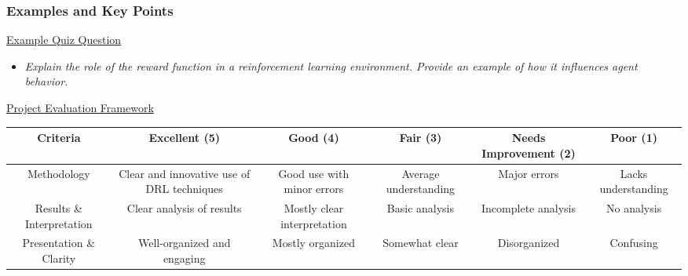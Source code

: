 \documentclass[aspectratio=169]{beamer}
\begin{document}
\begin{frame}[fragile]
  \frametitle{Examples and Key Points}

  \underline{Example Quiz Question}
  
  \begin{itemize}
    \item \textit{Explain the role of the reward function in a reinforcement learning environment. Provide an example of how it influences agent behavior.}
  \end{itemize}
  
  \underline{Project Evaluation Framework}
  
  \begin{table}[h]
    \centering
    \begin{tabular}{|c|c|c|c|c|c|}
      \hline
      Criteria & Excellent (5) & Good (4) & Fair (3) & Needs Improvement (2) & Poor (1) \\ \hline
      Methodology & Clear and innovative use of DRL techniques & Good use with minor errors & Average understanding & Major errors & Lacks understanding \\ \hline
      Results \& Interpretation & Clear analysis of results & Mostly clear interpretation & Basic analysis & Incomplete analysis & No analysis \\ \hline
      Presentation \& Clarity & Well-organized and engaging & Mostly organized & Somewhat clear & Disorganized & Confusing \\ \hline
    \end{tabular}
  \end{table}
\end{frame}
\end{document}
